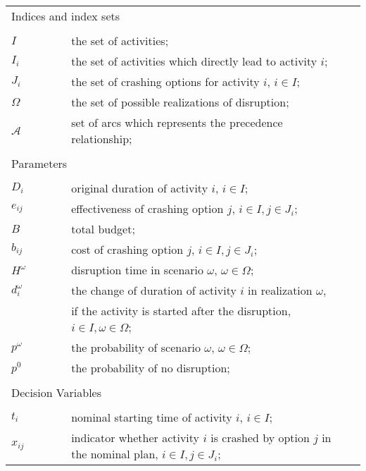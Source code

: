 \documentclass[11pt]{article}
\begin{document}
	\begin{table}[H]
		\begin{tabular}{ l l l l }
			\multicolumn{4}{l}{Indices and index sets} \\
			\\
			\(I\) & \(\qquad\) & the set of activities;&\\
			\(I_i\) & \(\qquad\) & the set of activities which directly lead to activity \(i\); &\\
			\(J_i\) & \(\qquad\) & the set of crashing options for activity \(i\), \(i \in I\);&\\
			\(\Omega\) & \(\qquad\) & the set of possible realizations of disruption;&\\
			\(\mathcal{A}\) &\(\qquad\) & set of arcs which represents the precedence relationship;&\\
			\\
			\multicolumn{4}{l}{Parameters} \\
			\\
			\(D_{i}\)& \(\qquad\) & original duration of activity \(i\), \(i \in I\);&\\
			\(e_{ij}\) & \(\qquad\) & effectiveness of crashing option \(j\), \(i \in I, j \in J_i\);&\\
			\(B\) & \(\qquad\) & total budget;&\\
			\(b_{ij}\) & \(\qquad\) & cost of crashing option \(j\), \(i \in I, j \in J_i\);&\\
			\(H^\omega\) &\(\qquad\) & disruption time in scenario \(\omega\), \(\omega \in \Omega\);&\\
			\(d_{i}^\omega\) & \(\qquad\)&the change of duration of activity \(i\) in realization \(\omega\), &\\
			& \(\qquad\) & if the activity is started after the disruption, \(i \in I, \omega \in \Omega\);& \\
			\(p^\omega\) & \(\qquad\) & the probability of scenario \(\omega\), \(\omega \in \Omega\);& \\
			\(p^0\) & \(\qquad\) & the probability of no disruption;& \\
			\\
			\multicolumn{4}{l}{Decision Variables}\\
			\\
			\(t_{i}\) & \(\qquad\) & nominal starting time of activity \(i\), \(i \in I\);&\\
			\(x_{ij}\) & \(\qquad\) & indicator whether activity \(i\) is crashed by option \(j\) in the nominal plan, \(i \in I, j \in J_i\); &\\

\end{tabular}
\end{table}
\end{document}
